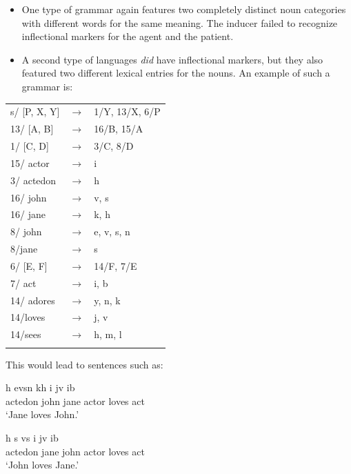 \begin{itemize}
\item One type of grammar again features two completely distinct noun categories with different words for the same meaning. The inducer failed to recognize inflectional markers for the agent and the patient.
\item A second type of languages {\em did} have inflectional markers, but they also featured two different lexical entries for the nouns. An example of such a grammar is:
\end{itemize}

\ea
\label{g:moy-grammar2}
\begin{tabular}{l c l}
s/ [P, X, Y] & $\rightarrow$  & 1/Y, 13/X, 6/P
\\ 13/ [A, B] & $\rightarrow$  & 16/B, 15/A
\\ 1/ [C, D] & $\rightarrow$  & 3/C, 8/D
\\ 15/ actor & $\rightarrow$  & i
\\ 3/ actedon & $\rightarrow$  & h
\\ 16/ john & $\rightarrow$  & v, s
\\ 16/ jane & $\rightarrow$  &  k, h
\\ 8/ john & $\rightarrow$  & e, v, s, n
\\ 8/jane & $\rightarrow$  & s
\\ 6/ [E, F] & $\rightarrow$  & 14/F, 7/E
\\ 7/ act & $\rightarrow$  & i, b
\\ 14/ adores & $\rightarrow$  & y, n, k
\\ 14/loves & $\rightarrow$  & j, v
\\ 14/sees & $\rightarrow$  & h, m, l
\\ \citep[p. 230]{moy06case}
\end{tabular}
\z

This would lead to sentences such as: 

\ea
\gll h evsn kh i jv ib \\
actedon john jane actor loves act \\
\glt `Jane loves John.' \\

\item
\gll h s vs i jv ib \\
actedon jane john actor loves act \\
\glt `John loves Jane.' \\
\z

